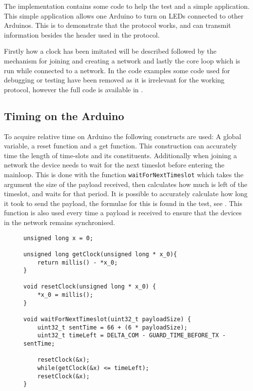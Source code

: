 \noindent
The implementation contains some code to help the test and a simple application. 
This simple application allows one Arduino to turn on LEDs connected to other Arduinos. 
This is to demonstrate that the protocol works, and can transmit information besides the header used in the protocol. 

Firstly how a clock has been imitated will be described followed by the mechanism for joining and creating a network and lastly the core loop which is run while connected to a network.
In the code examples some code used for debugging or testing have been removed as it is irrelevant for the working protocol, however the full code is available in . 

\subsection{Timing on the Arduino}
To acquire relative time on Arduino the following constructs are used: A global variable, a reset function and a get function. 
This construction can accurately time the length of time-slots and its constituents. 
Additionally when joining a network the device needs to wait for the next timeslot before entering the mainloop. 
This is done with the function \texttt{waitForNextTimeslot} which takes the argument the size of the payload received, then calculates how much is left of the timeslot, and waits for that period. 
It is possible to accurately calculate how long it took to send the payload, the formulae for this is found in the test, see  .
This function is also used every time a payload is received to ensure that the devices in the network remains synchronised. 
\begin{figure}
\begin{lstlisting}[style=customc,caption={The variable and functions used to implement timing.},label={lst:ccrc:timing}]
unsigned long x = 0;

unsigned long getClock(unsigned long * x_0){
    return millis() - *x_0;
}

void resetClock(unsigned long * x_0) {
    *x_0 = millis();
}

void waitForNextTimeslot(uint32_t payloadSize) {
    uint32_t sentTime = 66 + (6 * payloadSize);
    uint32_t timeLeft = DELTA_COM - GUARD_TIME_BEFORE_TX - sentTime;

    resetClock(&x);
    while(getClock(&x) <= timeLeft);
    resetClock(&x);
}

\end{lstlisting}
\end{figure}
